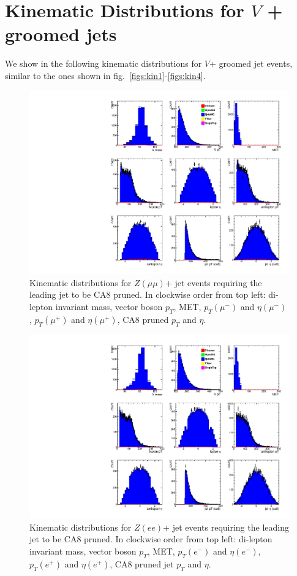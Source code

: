 \section{Kinematic Distributions for $V$ + groomed jets}
\label{app:kinematic}

We show in the following kinematic distributions for $V$+ groomed jet events, similar to the ones shown in fig.~\ref{figs:kin1}-\ref{figs:kin4}. 

\begin{figure}[htb]
\centering
\includegraphics[width=1.0\textwidth]{figs/kinematics_stack_ca8_Zmumu.pdf}
\caption{Kinematic distributions for $Z(\mu\mu)$+ jet events requiring the leading jet to be CA8 pruned. In clockwise order from top left: di-lepton invariant mass, vector boson $p_T$, MET, $p_T (\mu^-)$ and $\eta (\mu^-)$, $p_T (\mu^+)$ and $\eta (\mu^+)$, CA8 pruned $p_T$ and $\eta$.}
\label{figs:kin1_CA8}
\end{figure}

\begin{figure}[htb]
\centering
\includegraphics[width=1.0\textwidth]{figs/kinematics_stack_ca8_Zee.pdf}
\caption{Kinematic distributions for $Z(ee)$+ jet events requiring the leading jet to be CA8 pruned. In clockwise order from top left: di-lepton invariant mass, vector boson $p_T$, MET, $p_T (e^-)$ and $\eta (e^-)$, $p_T (e^+)$ and $\eta (e^+)$, CA8 pruned jet $p_T$ and $\eta$.}
\label{figs:kin2_CA8}
\end{figure}

